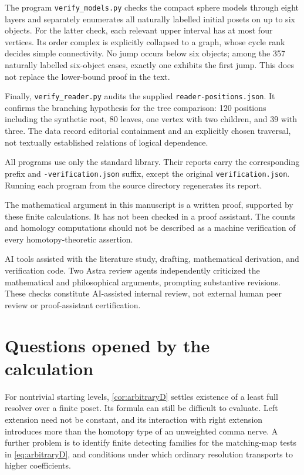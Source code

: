 The program \texttt{verify\_models.py} checks the compact sphere
models through eight layers and separately enumerates all naturally
labelled initial posets on up to six objects. For the latter check,
each relevant upper interval has at most four vertices. Its order
complex is explicitly collapsed to a graph, whose cycle rank decides
simple connectivity. No jump occurs below six objects; among the 357
naturally labelled six-object cases, exactly one exhibits the first
jump. This does not replace the lower-bound proof in the text.

Finally, \texttt{verify\_reader.py} audits the supplied
\texttt{reader-positions.json}. It confirms the branching hypothesis
for the tree comparison: 120 positions including the synthetic root,
80 leaves, one vertex with two children, and 39 with three. The data
record editorial containment and an explicitly chosen traversal, not
textually established relations of logical dependence.

All programs use only the standard library. Their reports carry the
corresponding prefix and \texttt{-verification.json} suffix, except
the original \texttt{verification.json}. Running each program from
the source directory regenerates its report.

The mathematical argument in this manuscript is a written proof, supported
by these finite calculations. It has not been checked in a proof assistant.
The counts and homology computations should not be described as a
machine verification of every homotopy-theoretic assertion.

\noindent\begin{minipage}{\linewidth}
AI tools assisted with the literature study, drafting, mathematical derivation,
and verification code. Two Astra review agents independently criticized the
mathematical and philosophical arguments, prompting substantive revisions.
These checks constitute AI-assisted internal review, not external human
peer review or proof-assistant certification.
\end{minipage}

\section{Questions opened by the calculation}

For nontrivial starting levels, \cref{cor:arbitraryD} settles existence
of a least full resolver over a finite poset. Its formula can still be
difficult to evaluate. Left extension need not be constant, and its
interaction with right extension introduces more than the homotopy
type of an unweighted comma nerve. A further problem is to identify
finite detecting families for the matching-map tests in
\eqref{eq:arbitraryD}, and conditions under which ordinary resolution
transports to higher coefficients.

